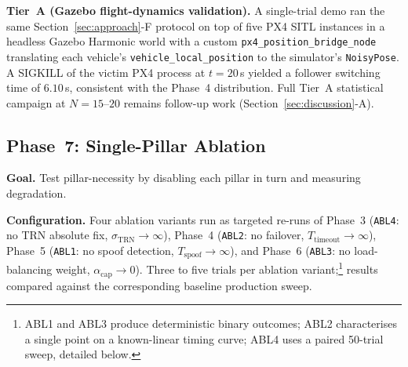 \documentclass[journal,10pt,twocolumn]{IEEEtran}
\begin{document}
\textbf{Tier~A (Gazebo flight-dynamics validation).} A single-trial demo ran the same Section~\ref{sec:approach}-F protocol on top of five PX4 SITL instances in a headless Gazebo Harmonic world with a custom \texttt{px4\_position\_bridge\_node} translating each vehicle's \texttt{vehicle\_local\_position} to the simulator's \texttt{NoisyPose}. A SIGKILL of the victim PX4 process at $t=20$\,s yielded a follower switching time of $6.10$\,s, consistent with the Phase~4 distribution. Full Tier~A statistical campaign at $N{=}15$--$20$ remains follow-up work (Section~\ref{sec:discussion}-A).

\subsection{Phase~7: Single-Pillar Ablation}
\label{sec:phase7-ablation}

\textbf{Goal.} Test pillar-necessity by disabling each pillar in turn and measuring degradation.

\textbf{Configuration.} Four ablation variants run as targeted re-runs of Phase~3 (\texttt{ABL4}: no TRN absolute fix, $\sigma_\text{TRN}\to\infty$), Phase~4 (\texttt{ABL2}: no failover, $T_\text{timeout}\to\infty$), Phase~5 (\texttt{ABL1}: no spoof detection, $T_\text{spoof}\to\infty$), and Phase~6 (\texttt{ABL3}: no load-balancing weight, $\alpha_\text{cap}\to 0$). Three to five trials per ablation variant;\footnote{ABL1 and ABL3 produce deterministic binary outcomes; ABL2 characterises a single point on a known-linear timing curve; ABL4 uses a paired 50-trial sweep, detailed below.} results compared against the corresponding baseline production sweep.
\end{document}
